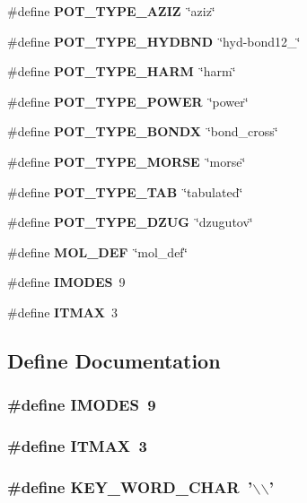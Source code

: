 \begin{CompactItemize}
$$\item 
\#define {\bf POT\_\-TYPE\_\-AZIZ}~\char`\"{}aziz\char`\"{}
\item 
\#define {\bf POT\_\-TYPE\_\-HYDBND}~\char`\"{}hyd-bond12\_\char`\"{}
\item 
\#define {\bf POT\_\-TYPE\_\-HARM}~\char`\"{}harm\char`\"{}
\item 
\#define {\bf POT\_\-TYPE\_\-POWER}~\char`\"{}power\char`\"{}
\item 
\#define {\bf POT\_\-TYPE\_\-BONDX}~\char`\"{}bond\_\-cross\char`\"{}
\item 
\#define {\bf POT\_\-TYPE\_\-MORSE}~\char`\"{}morse\char`\"{}
\item 
\#define {\bf POT\_\-TYPE\_\-TAB}~\char`\"{}tabulated\char`\"{}
\item 
\#define {\bf POT\_\-TYPE\_\-DZUG}~\char`\"{}dzugutov\char`\"{}
\item 
\#define {\bf MOL\_\-DEF}~\char`\"{}mol\_\-def\char`\"{}
\item 
\#define {\bf IMODES}~9
\item 
\#define {\bf ITMAX}~3
\end{CompactItemize}


\subsection{Define Documentation}
\subsubsection{\setlength{\rightskip}{0pt plus 5cm}\#define IMODES~9}\label{md__defines_8h_a09fef7f0c3dba5e30afc6b7cfebb7bc}


\subsubsection{\setlength{\rightskip}{0pt plus 5cm}\#define ITMAX~3}\label{md__defines_8h_3641b6d4c21b7a852dbb32c2b693302e}


\subsubsection{\setlength{\rightskip}{0pt plus 5cm}\#define KEY\_\-WORD\_\-CHAR~'$\backslash$$\backslash$'}\label{md__defines_8h_3a15ea93993d702f2ee8a9edff455fc9}



